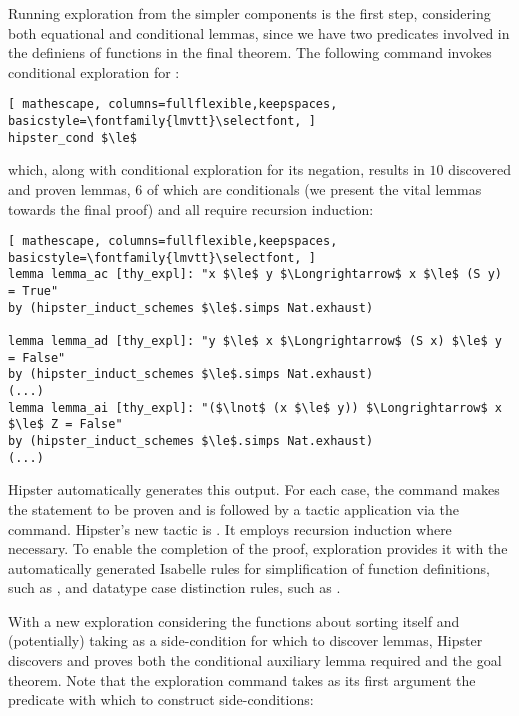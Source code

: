 Running exploration from the simpler components is the first step, considering both equational and conditional lemmas, since we have two predicates involved in the definiens of functions in the final theorem.
%
The following command invokes conditional exploration for \isaCode{$\le$}:

\begin{lstlisting}[ mathescape, columns=fullflexible,keepspaces, basicstyle=\fontfamily{lmvtt}\selectfont, ]
hipster_cond $\le$
\end{lstlisting}

\noindent which, along with conditional exploration for its negation, results in $10$ discovered and proven lemmas, $6$ of which are conditionals (we present the vital lemmas towards the final proof) and all require recursion induction:

\begin{lstlisting}[ mathescape, columns=fullflexible,keepspaces, basicstyle=\fontfamily{lmvtt}\selectfont, ]
lemma lemma_ac [thy_expl]: "x $\le$ y $\Longrightarrow$ x $\le$ (S y) = True"
by (hipster_induct_schemes $\le$.simps Nat.exhaust)

lemma lemma_ad [thy_expl]: "y $\le$ x $\Longrightarrow$ (S x) $\le$ y = False"
by (hipster_induct_schemes $\le$.simps Nat.exhaust)
(...)
lemma lemma_ai [thy_expl]: "($\lnot$ (x $\le$ y)) $\Longrightarrow$ x $\le$ Z = False"
by (hipster_induct_schemes $\le$.simps Nat.exhaust)
(...)
\end{lstlisting}

\noindent Hipster automatically generates this output.
%
For each case, the  command makes the statement to be proven and is followed by a tactic application via the  command.
%
Hipster's new tactic is .
%
It employs recursion induction where necessary.
%
To enable the completion of the proof, exploration provides it with the automatically generated Isabelle rules for simplification of function definitions, such as , and datatype case distinction rules, such as .

With a new exploration considering the functions about sorting itself and (potentially) taking  as a side-condition for which to discover lemmas, Hipster discovers and proves both the conditional auxiliary lemma required and the goal theorem.
%
Note that the exploration command takes as its first argument the predicate with which to construct side-conditions:

